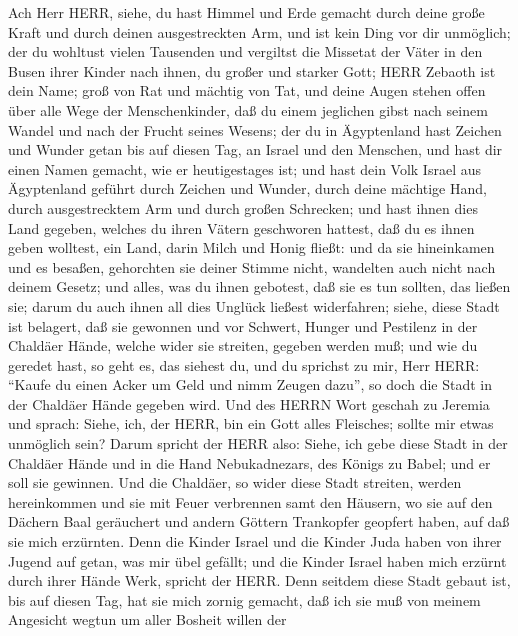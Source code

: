  Ach Herr HERR, siehe, du hast Himmel und Erde gemacht
durch deine große Kraft und durch deinen ausgestreckten Arm, und ist
kein Ding vor dir unmöglich;  der du wohltust vielen
Tausenden und vergiltst die Missetat der Väter in den Busen ihrer Kinder
nach ihnen, du großer und starker Gott; HERR Zebaoth ist dein Name;
 groß von Rat und mächtig von Tat, und deine Augen stehen
offen über alle Wege der Menschenkinder, daß du einem jeglichen gibst
nach seinem Wandel und nach der Frucht seines Wesens;  der
du in Ägyptenland hast Zeichen und Wunder getan bis auf diesen Tag, an
Israel und den Menschen, und hast dir einen Namen gemacht, wie er
heutigestages ist;  und hast dein Volk Israel aus
Ägyptenland geführt durch Zeichen und Wunder, durch deine mächtige Hand,
durch ausgestrecktem Arm und durch großen Schrecken;  und
hast ihnen dies Land gegeben, welches du ihren Vätern geschworen
hattest, daß du es ihnen geben wolltest, ein Land, darin Milch und Honig
fließt:  und da sie hineinkamen und es besaßen, gehorchten
sie deiner Stimme nicht, wandelten auch nicht nach deinem Gesetz; und
alles, was du ihnen gebotest, daß sie es tun sollten, das ließen sie;
darum du auch ihnen all dies Unglück ließest widerfahren; 
siehe, diese Stadt ist belagert, daß sie gewonnen und vor Schwert,
Hunger und Pestilenz in der Chaldäer Hände, welche wider sie streiten,
gegeben werden muß; und wie du geredet hast, so geht es, das siehest du,
 und du sprichst zu mir, Herr HERR: ``Kaufe du einen Acker
um Geld und nimm Zeugen dazu'', so doch die Stadt in der Chaldäer Hände
gegeben wird.  Und des HERRN Wort geschah zu Jeremia und
sprach:  Siehe, ich, der HERR, bin ein Gott alles
Fleisches; sollte mir etwas unmöglich sein?  Darum spricht
der HERR also: Siehe, ich gebe diese Stadt in der Chaldäer Hände und in
die Hand Nebukadnezars, des Königs zu Babel; und er soll sie gewinnen.
 Und die Chaldäer, so wider diese Stadt streiten, werden
hereinkommen und sie mit Feuer verbrennen samt den Häusern, wo sie auf
den Dächern Baal geräuchert und andern Göttern Trankopfer geopfert
haben, auf daß sie mich erzürnten.  Denn die Kinder Israel
und die Kinder Juda haben von ihrer Jugend auf getan, was mir übel
gefällt; und die Kinder Israel haben mich erzürnt durch ihrer Hände
Werk, spricht der HERR.  Denn seitdem diese Stadt gebaut
ist, bis auf diesen Tag, hat sie mich zornig gemacht, daß ich sie muß
von meinem Angesicht wegtun  um aller Bosheit willen der
